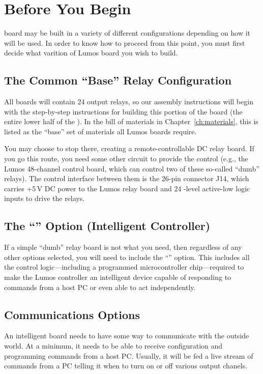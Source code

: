 \documentclass[letterpaper,twoside,onecolumn,openright,final]{memoir}
\begin{document}
\chapter{Before You Begin}\label{ch:before}
 board may be built in a variety of different configurations
depending on how it will be used.  In order to know how to proceed from this point, you must
first decide what varition of Lumos board you wish to build.

\section{The Common ``Base'' Relay Configuration}

All boards
will contain 24 output relays, so our assembly instructions will begin with the step-by-step 
instructions for building this portion of the board (the entire lower half of the ).
In the bill of materials in Chapter~\ref{ch:materials}, this is listed as the ``base'' set of
materials all Lumos boards require.

You may choose to stop there, creating a remote-controllable DC relay board.  If you go this route,
you need some other circuit to provide the control (e.g., the Lumos 48-channel control board,
which can control two of these so-called ``dumb'' relays).  The control interface between them is the
26-pin connector J14, which carries +5\,V DC power to the Lumos relay board and 24 -level
active-low logic inputs to drive the relays.


\section{The ``'' Option (Intelligent Controller)}
If a simple ``dumb'' relay board is not what you need, then regardless of any other options selected, 
you will need to include the ``'' option.  This includes all the control logic---including
a programmed microcontroller chip---required to make the Lumos controller an intelligent device capable
of responding to commands from a host PC or even able to act independently.

\section{Communications Options}
An intelligent board needs to have some way to communicate with the outside world.  At a minimum, it needs
to be able to receive configuration and programming commands from a host PC.  Usually, it will be fed
a live stream of commands from a PC telling it when to turn on or off various output chanels.
\end{document}
